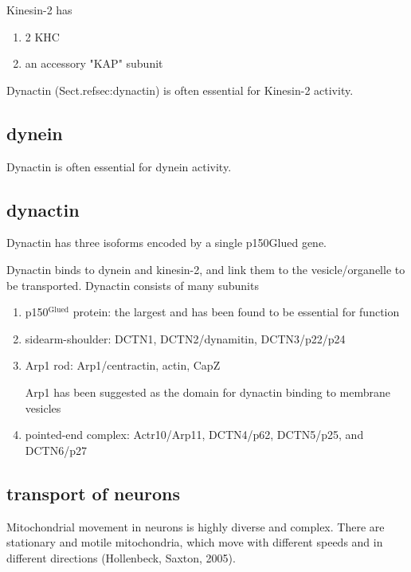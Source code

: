 Kinesin-2 has
\begin{enumerate}
  \item 2 KHC
  \item an accessory "KAP" subunit
\end{enumerate}
Dynactin (Sect.ref{sec:dynactin}) is often essential for Kinesin-2 activity.

\subsection{dynein}
\label{sec:dynein}

Dynactin is often essential for dynein activity.

\subsection{dynactin}
\label{sec:dynactin}

Dynactin has three isoforms encoded by a single p150Glued gene.

Dynactin binds to dynein and kinesin-2, and link them to the vesicle/organelle
to be transported. Dynactin consists of many subunits
\begin{enumerate}
  \item p150$^{\text{Glued}}$ protein:
  the largest and has been found to be essential for function

  \item sidearm-shoulder: DCTN1, DCTN2/dynamitin, DCTN3/p22/p24

  \item Arp1 rod: Arp1/centractin, actin, CapZ

Arp1 has been suggested as the domain for dynactin binding to membrane vesicles

  \item pointed-end complex:  Actr10/Arp11, DCTN4/p62, DCTN5/p25, and
  DCTN6/p27
\end{enumerate}

\subsection{transport of neurons}
\label{sec:mitochondria-brain-transport}

Mitochondrial movement in neurons is highly diverse and complex. There are
stationary and motile mitochondria, which move with different speeds and in
different directions (Hollenbeck, Saxton, 2005).

